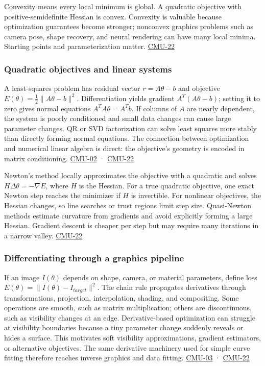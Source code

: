 Convexity means every local minimum is global. A quadratic objective with positive-semidefinite Hessian is convex. Convexity is valuable because optimization guarantees become stronger; nonconvex graphics problems such as camera pose, shape recovery, and neural rendering can have many local minima. Starting points and parameterization matter. \hyperref[04-visual-computing-ii-ch036]{CMU-22}

\subsubsection{Quadratic objectives and linear systems}\label{quadratic-objectives-and-linear-systems}

A least-squares problem has residual vector \(r=A\theta-b\) and objective \(E(\theta)=\tfrac12\|A\theta-b\|^2\). Differentiation yields gradient \(A^T(A\theta-b)\); setting it to zero gives normal equations \(A^TA\theta=A^Tb\). If columns of \(A\) are nearly dependent, the system is poorly conditioned and small data changes can cause large parameter changes. QR or SVD factorization can solve least squares more stably than directly forming normal equations. The connection between optimization and numerical linear algebra is direct: the objective's geometry is encoded in matrix conditioning. \hyperref[04-visual-computing-ii-ch036]{CMU-02} · \hyperref[04-visual-computing-ii-ch036]{CMU-22}

Newton's method locally approximates the objective with a quadratic and solves \(H\Delta\theta=-\nabla E\), where \(H\) is the Hessian. For a true quadratic objective, one exact Newton step reaches the minimizer if \(H\) is invertible. For nonlinear objectives, the Hessian changes, so line searches or trust regions limit step size. Quasi-Newton methods estimate curvature from gradients and avoid explicitly forming a large Hessian. Gradient descent is cheaper per step but may require many iterations in a narrow valley. \hyperref[04-visual-computing-ii-ch036]{CMU-22}

\subsubsection{Differentiating through a graphics pipeline}\label{differentiating-through-a-graphics-pipeline}

If an image \(I(\theta)\) depends on shape, camera, or material parameters, define loss \(E(\theta)=\|I(\theta)-I_{target}\|^2\). The chain rule propagates derivatives through transformations, projection, interpolation, shading, and compositing. Some operations are smooth, such as matrix multiplication; others are discontinuous, such as visibility changes at an edge. Derivative-based optimization can struggle at visibility boundaries because a tiny parameter change suddenly reveals or hides a surface. This motivates soft visibility approximations, gradient estimators, or alternative objectives. The same derivative machinery used for simple curve fitting therefore reaches inverse graphics and data fitting. \hyperref[04-visual-computing-ii-ch036]{CMU-03} · \hyperref[04-visual-computing-ii-ch036]{CMU-22}

